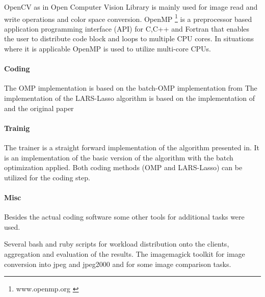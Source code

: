 OpenCV \cite{OpenCV} as in Open Computer Vision Library is mainly used for
image read and write operations and color space conversion. OpenMP
\footnote{www.openmp.org \cite{OpenMP}} is a preprocessor based application
programming interface (API) for C,C++ and Fortran that enables the user to
distribute code block and loops to multiple CPU cores. In situations where it is
applicable OpenMP is used to utilize multi-core CPUs. 

\paragraph{Coding}
The OMP implementation is based on the batch-OMP implementation
from\cite{Rubinstein} The implementation of the LARS-Lasso algorithm is based on
the implementation of\cite{Strand2005} and the original paper\cite{Efron2004}

\paragraph{Trainig}
The \trainDL trainer is a straight forward implementation of the
algorithm presented in\cite{Mairal2010}. It is an implementation of the basic
version of the algorithm with the batch optimization applied. Both coding
methods (OMP and LARS-Lasso) can be utilized for the coding step.

\paragraph{Misc}
 Besides the actual coding software some other tools for
additional tasks were used.

Several bash and ruby scripts for workload distribution onto the
clients, aggregation and evaluation of the results. The imagemagick toolkit for
image conversion into jpeg and jpeg2000 and for some image comparison tasks.








